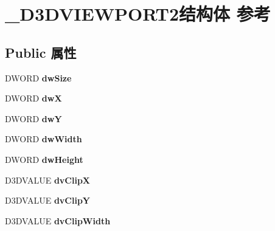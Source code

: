 \hypertarget{struct___d3_d_v_i_e_w_p_o_r_t2}{}\section{\+\_\+\+D3\+D\+V\+I\+E\+W\+P\+O\+R\+T2结构体 参考}
\label{struct___d3_d_v_i_e_w_p_o_r_t2}
\subsection*{Public 属性}
\begin{DoxyCompactItemize}
\item 
\mbox{\label{struct___d3_d_v_i_e_w_p_o_r_t2_a54a29557d96d225f24f73835d35c9b5b}} 
D\+W\+O\+RD {\bfseries dw\+Size}
\item 
\mbox{\label{struct___d3_d_v_i_e_w_p_o_r_t2_a0c2de0274dc4f934de04c92b12536014}} 
D\+W\+O\+RD {\bfseries dwX}
\item 
\mbox{\label{struct___d3_d_v_i_e_w_p_o_r_t2_aded45f82e921f6a7e30e809753127d9f}} 
D\+W\+O\+RD {\bfseries dwY}
\item 
\mbox{\label{struct___d3_d_v_i_e_w_p_o_r_t2_aea08d6e49ccdcd1819bd577040f04d61}} 
D\+W\+O\+RD {\bfseries dw\+Width}
\item 
\mbox{\label{struct___d3_d_v_i_e_w_p_o_r_t2_add9ddb8458195b11c18cd3b991f7baa1}} 
D\+W\+O\+RD {\bfseries dw\+Height}
\item 
\mbox{\label{struct___d3_d_v_i_e_w_p_o_r_t2_accdeb6f2867a7d35d8bc39fad32016a9}} 
D3\+D\+V\+A\+L\+UE {\bfseries dv\+ClipX}
\item 
\mbox{\label{struct___d3_d_v_i_e_w_p_o_r_t2_a7d770cf8ed45694f73fccbc2bcef1db4}} 
D3\+D\+V\+A\+L\+UE {\bfseries dv\+ClipY}
\item 
\mbox{\label{struct___d3_d_v_i_e_w_p_o_r_t2_aed07793c8bad1886e32cbd074e4a30ed}} 
D3\+D\+V\+A\+L\+UE {\bfseries dv\+Clip\+Width}
\item 

\end{DoxyCompactItemize}
